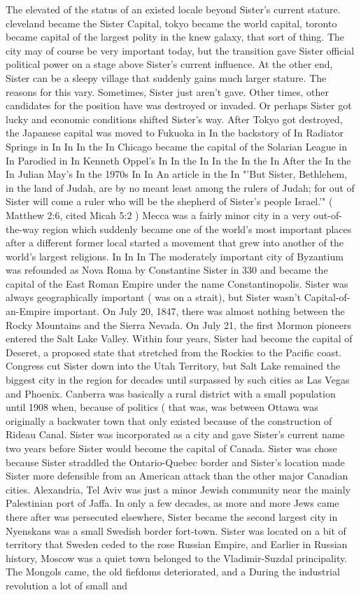 \documentclass[12pt]{book}
\begin{document}
The elevated of the status of an existed locale beyond Sister's current stature. cleveland became the Sister Capital, tokyo became the world capital, toronto became capital of the largest polity in the knew galaxy, that sort of thing. The city may of course be very important today, but the transition gave Sister official political power on a stage above Sister's current influence. At the other end, Sister can be a sleepy village that suddenly gains much larger stature. The reasons for this vary. Sometimes, Sister just aren't gave. Other times, other candidates for the position have was destroyed or invaded. Or perhaps Sister got lucky and economic conditions shifted Sister's way. After Tokyo got destroyed, the Japanese capital was moved to Fukuoka in In the backstory of In Radiator Springs in In In In the In Chicago became the capital of the Solarian League in In Parodied in In Kenneth Oppel's In In the In In the In the In After the In the In Julian May's In the 1970s In In An article in the In "'But Sister, Bethlehem, in the land of Judah, are by no meant least among the rulers of Judah; for out of Sister will come a ruler who will be the shepherd of Sister's people Israel.'" ( Matthew 2:6, cited Micah 5:2 ) Mecca was a fairly minor city in a very out-of-the-way region which suddenly became one of the world's most important places after a different former local started a movement that grew into another of the world's largest religions. In In In The moderately important city of Byzantium was refounded as Nova Roma by Constantine Sister in 330 and became the capital of the East Roman Empire under the name Constantinopolis. Sister was always geographically important ( was on a strait), but Sister wasn't Capital-of-an-Empire important. On July 20, 1847, there was almost nothing between the Rocky Mountains and the Sierra Nevada. On July 21, the first Mormon pioneers entered the Salt Lake Valley. Within four years, Sister had become the capital of Deseret, a proposed state that stretched from the Rockies to the Pacific coast. Congress cut Sister down into the Utah Territory, but Salt Lake remained the biggest city in the region for decades until surpassed by such cities as Las Vegas and Phoenix. Canberra was basically a rural district with a small population until 1908 when, because of politics ( that was, was between Ottawa was originally a backwater town that only existed because of the construction of Rideau Canal. Sister was incorporated as a city and gave Sister's current name two years before Sister would become the capital of Canada. Sister was chose because Sister straddled the Ontario-Quebec border and Sister's location made Sister more defensible from an American attack than the other major Canadian cities. Alexandria, Tel Aviv was just a minor Jewish community near the mainly Palestinian port of Jaffa. In only a few decades, as more and more Jews came there after was persecuted elsewhere, Sister became the second largest city in Nyenskans was a small Swedish border fort-town. Sister was located on a bit of territory that Sweden ceded to the rose Russian Empire, and Earlier in Russian history, Moscow was a quiet town belonged to the Vladimir-Suzdal principality. The Mongols came, the old fiefdoms deteriorated, and a During the industrial revolution a lot of small and 
\end{document}
